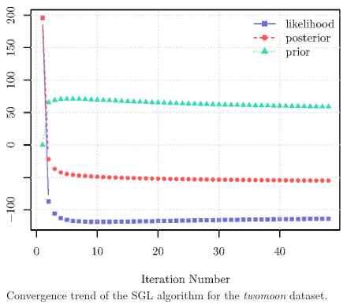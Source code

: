 \begin{figure}[!htb]
  \centering
  \includegraphics[width=.4\textwidth]{clusters/twomoon_trend.eps}
  \caption{Convergence trend of the \textsf{SGL} algorithm for the \textit{twomoon} dataset.}
  \label{fig:twomoon_trend}
\end{figure}
